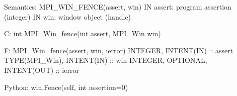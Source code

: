 Semantics:
MPI_WIN_FENCE(assert, win)
IN assert: program assertion (integer)
IN win: window object (handle)

C:
int MPI_Win_fence(int assert, MPI_Win win)

F:
MPI_Win_fence(assert, win, ierror)
INTEGER, INTENT(IN) :: assert
TYPE(MPI_Win), INTENT(IN) :: win
INTEGER, OPTIONAL, INTENT(OUT) :: ierror

Python:
win.Fence(self, int assertion=0)
